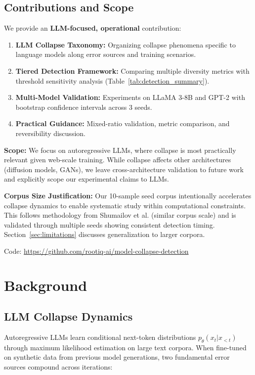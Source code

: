 \documentclass[conference]{IEEEtran}
\begin{document}
\subsection{Contributions and Scope}

We provide an \textbf{LLM-focused, operational} contribution:

\begin{enumerate}
    \item \textbf{LLM Collapse Taxonomy:} Organizing collapse phenomena specific to language models along error sources and training scenarios.
    \item \textbf{Tiered Detection Framework:} Comparing multiple diversity metrics with threshold sensitivity analysis (Table~\ref{tab:detection_summary}).
    \item \textbf{Multi-Model Validation:} Experiments on LLaMA 3-8B and GPT-2 with bootstrap confidence intervals across 3 seeds.
    \item \textbf{Practical Guidance:} Mixed-ratio validation, metric comparison, and reversibility discussion.
\end{enumerate}

\textbf{Scope:} We focus on autoregressive LLMs, where collapse is most practically relevant given web-scale training. While collapse affects other architectures (diffusion models, GANs), we leave cross-architecture validation to future work and explicitly scope our experimental claims to LLMs.

\textbf{Corpus Size Justification:} Our 10-sample seed corpus intentionally accelerates collapse dynamics to enable systematic study within computational constraints. This follows methodology from Shumailov et al. \cite{shumailov2024nature} (similar corpus scale) and is validated through multiple seeds showing consistent detection timing. Section~\ref{sec:limitations} discusses generalization to larger corpora.

Code: \url{https://github.com/rootiq-ai/model-collapse-detection}

\section{Background}

\subsection{LLM Collapse Dynamics}

Autoregressive LLMs learn conditional next-token distributions $p_\theta(x_t | x_{<t})$ through maximum likelihood estimation on large text corpora. When fine-tuned on synthetic data from previous model generations, two fundamental error sources compound across iterations:
\end{document}
